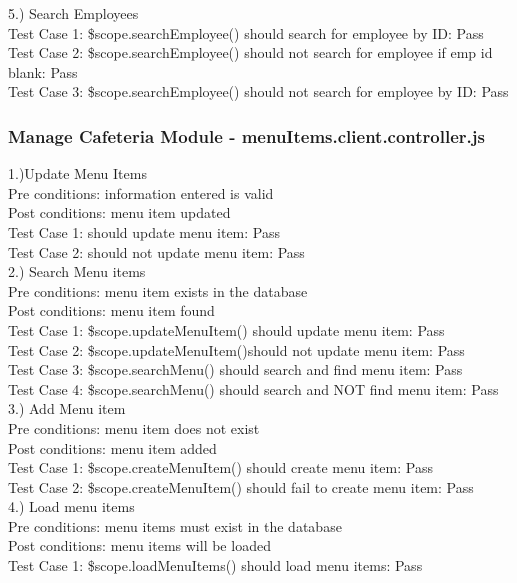\documentclass[a4paper,12pt]{article}
\begin{document}
5.) Search Employees \\
Test Case 1: \$scope.searchEmployee() should search for employee by ID: Pass \\
Test Case 2:  \$scope.searchEmployee() should not search for employee if emp id blank: Pass \\
Test Case 3: \$scope.searchEmployee() should not search for employee by ID: Pass \\

\subsubsection{Manage Cafeteria Module - menuItems.client.controller.js }
1.)Update Menu Items \\
Pre conditions: information entered is valid\\
Post conditions: menu item updated\\
Test Case 1: should update menu item: Pass \\
Test Case 2: should not update menu item: Pass \\

2.) Search Menu items \\
Pre conditions: menu item exists in the database \\
Post conditions: menu item found \\
Test Case 1: \$scope.updateMenuItem() should update menu item: Pass \\
Test Case 2: \$scope.updateMenuItem()should not update menu item: Pass \\
Test Case 3: \$scope.searchMenu() should search and find menu item: Pass \\
Test Case 4: \$scope.searchMenu() should search and NOT find menu item: Pass \\

3.) Add Menu item \\
Pre conditions: menu item does not exist\\
Post conditions: menu item added\\
Test Case 1: \$scope.createMenuItem() should create menu item: Pass\\
Test Case 2: \$scope.createMenuItem() should fail to create menu item: Pass\\

4.) Load menu items \\
Pre conditions: menu items must exist in the database\\
Post conditions: menu items will be loaded \\
Test Case 1: \$scope.loadMenuItems() should load menu items: Pass \\ 
\end{document}
